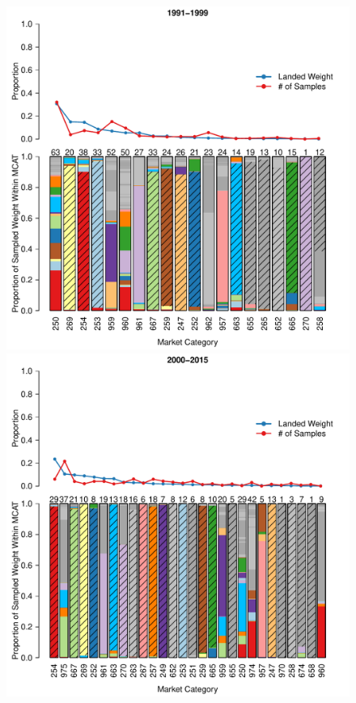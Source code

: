 \documentclass{article}
\begin{document}
\begin{figure}
\begin{minipage}[!ht]{0.89\textwidth}
\begin{center}
			$~$\\$~$\\
				
			\begin{minipage}[!ht]{0.4\textwidth}
        	               \includegraphics[width=1.0\textwidth]{1991to1999Bar3.pdf}
        	       \end{minipage}
        	       \begin{minipage}[!ht]{0.4\textwidth}
        	               \includegraphics[width=1.0\textwidth]{2000to2015Bar3.pdf}

\end{minipage}
\end{center}
\end{minipage}
\end{figure}
\end{document}

